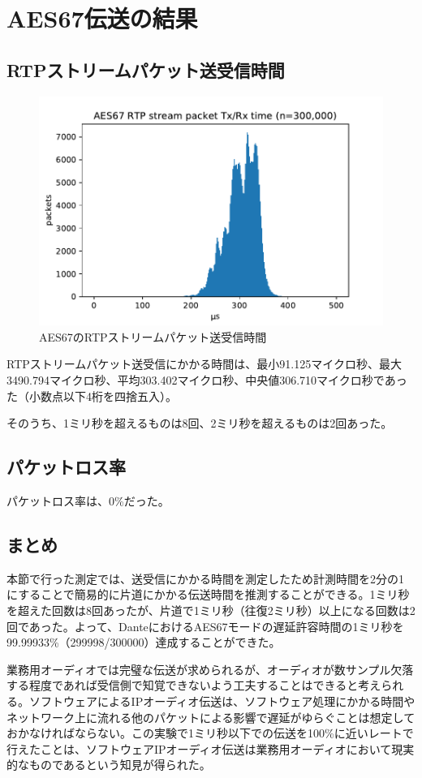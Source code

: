 \section{AES67伝送の結果}

\subsection{RTPストリームパケット送受信時間}

\begin{figure}[htbp]
  \centering
  \includegraphics[width=\linewidth]{img/packets_graph.pdf}
  \caption{AES67のRTPストリームパケット送受信時間}
  \label{fig:packets_graph}
\end{figure}

RTPストリームパケット送受信にかかる時間は、最小91.125マイクロ秒、最大3490.794マイクロ秒、平均303.402マイクロ秒、中央値306.710マイクロ秒であった（小数点以下4桁を四捨五入）。

そのうち、1ミリ秒を超えるものは8回、2ミリ秒を超えるものは2回あった。

\subsection{パケットロス率}

パケットロス率は、0\%だった。

\subsection{まとめ}

本節で行った測定では、送受信にかかる時間を測定したため計測時間を2分の1にすることで簡易的に片道にかかる伝送時間を推測することができる。1ミリ秒を超えた回数は8回あったが、片道で1ミリ秒（往復2ミリ秒）以上になる回数は2回であった。よって、DanteにおけるAES67モードの遅延許容時間の1ミリ秒を99.99933\%（299998/300000）達成することができた。

業務用オーディオでは完璧な伝送が求められるが、オーディオが数サンプル欠落する程度であれば受信側で知覚できないよう工夫することはできると考えられる。ソフトウェアによるIPオーディオ伝送は、ソフトウェア処理にかかる時間やネットワーク上に流れる他のパケットによる影響で遅延がゆらぐことは想定しておかなければならない。この実験で1ミリ秒以下での伝送を100\%に近いレートで行えたことは、ソフトウェアIPオーディオ伝送は業務用オーディオにおいて現実的なものであるという知見が得られた。
